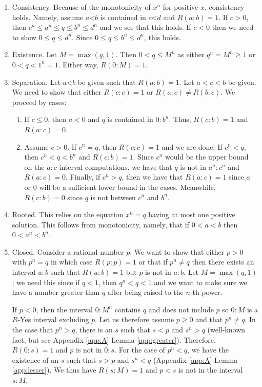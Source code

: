\documentclass[12pt]{article}
\theoremstyle{remark}
\newcommand{\lt}{\mathord{<}}
\begin{document}
\begin{enumerate}
    \item Consistency. Because of the monotonicity of $x^n$ for positive $x$, consistency holds. Namely, assume $a\lt b$ is contained in $c \lt d$ and $R(a:b)=1$. If $c>0$, then $c^n \leq a^n \leq q \leq b^n \leq d^n$ and we see that this holds. If $c<0$ then we need to show $0 \leq q \leq d^n$. Since $0 \leq q \leq  b^n \leq d^n$, this holds. 
    \item Existence. Let $M = \max(q, 1)$. Then $0 < q \leq M^n$ as either $q^n = M^n \geq 1$ or $0 < q < 1^n = 1$. Either way, $R(0:M) = 1$. 
    \item Separation. Let $a\lt b$ be given such that $R(a:b)=1$. Let $a < c <b$ be given. We need to show that either $R(c:c) = 1$ or $R(a:c) \neq R(b:c)$. We proceed by cases:
    \begin{enumerate}
        \item If $c \leq 0$, then $a<0$ and $q$ is contained in $0:b^n$. Thus, $R(c:b) = 1$ and $R(a:c) = 0$. 
        \item Assume $c>0$. If $c^n = q$, then $R(c:c)=1$ and we are done. If $c^n < q$, then $c^n < q< b^n$ and $R(c:b)=1$. Since $c^n$ would be the upper bound on the $a:c$ interval computations, we have that $q$ is not in $a^n:c^n$ and $R(a:c)=0$. Finally, if $c^n > q$, then we have that $R(a:c)=1$ since $a$ or $0$ will be a sufficient lower bound in the cases. Meanwhile, $R(c:b) = 0$ since $q$ is not between $c^n$ and $b^n$. 
    \end{enumerate}
     \item Rooted. This relies on the equation $x^n = q$ having at most one positive solution. This follows from monotonicity, namely, that if $ 0 < a < b$ then $0 < a^n < b^n$. 
    \item Closed. Consider a rational number $p$. We want to show that either $p>0$ with $p^n = q$ in which case $R(p:p)=1$ or that if $p^n \neq q$ then there exists an interval $a:b$ such that $R(a:b)=1$ but $p$ is not in $a:b$. Let $M = \max(q, 1)$; we need this since if $q<1$, then $q^n < q < 1$ and we want to make sure we have a number greater than $q$ after being raised to the $n$-th power. 
    
    If $p < 0$, then the interval $0:M^n$ contains $q$ and does not include $p$ so $0:M$ is a $R$-Yes interval excluding $p$. Let us therefore assume $p \geq 0$ and that $p^n \neq q$. In the case that $p^n > q$, there is an $s$ such that $s<p$ and $s^n > q$ (well-known fact, but see Appendix \ref{app:A} Lemma \ref{app:greater}). Therefore, $R(0:s) = 1$ and $p$ is not in $0:s$. For the case of $p^n < q$, we have the existence of an $s$ such that $s > p$ and $s^n < q$ (Appendix \ref{app:A} Lemma \ref{app:lesser}). We thus have $R(s:M)=1$ and $p < s$ is not in the interval $s:M$. 
    
\end{enumerate}
\end{document}
